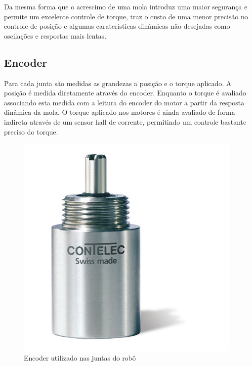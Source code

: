 Da mesma forma que o acrescimo de uma mola introduz uma maior segurança e permite um excelente controle de torque, traz o custo de uma menor precisão no controle de posição e algumas caraterísticas dinâmicas não desejadas como oscilações e respostas mais lentas.





\subsection{Encoder}

Para cada junta são medidas as grandezas a posição e o torque aplicado. A posição é medida diretamente através do encoder. Enquanto o torque é avaliado associando esta medida com a leitura do encoder do motor a partir da resposta dinâmica da mola. O torque aplicado nos motores é ainda avaliado de forma indireta através de um sensor hall de corrente, permitindo um controle bastante preciso do torque.

\begin{figure}[H]
    \centering
    \includegraphics[width = 0.4\linewidth]{figs/vertX-encoder}
        \caption{Encoder utilizado nas juntas do robô}
    \label{fig:encoder}
\end{figure}

